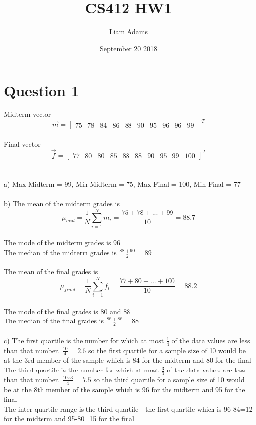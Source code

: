 \documentclass{article}
\title{CS412 HW1}
\author{Liam Adams }
\date{September 20 2018}
\begin{document}
\maketitle

\section{Question 1}
Midterm vector $$\vec{m} = \begin{bmatrix} 75 & 78 & 84 & 86 & 88 & 90 & 95 & 96 & 96 & 99 \end{bmatrix}^T$$\\
Final vector $$\vec{f} = \begin{bmatrix} 77 & 80 & 80 & 85 & 88 & 88 & 90 & 95 & 99 & 100 \end{bmatrix}^T$$\\\\
a) Max Midterm = 99, Min Midterm = 75, Max Final = 100, Min Final = 77\\\\
b) The mean of the midterm grades is $$\mu_{mid}=\frac{1}{N}\sum\limits_{i=1}^{N} m_i=\frac{75+78+...+99}{10}=88.7$$\\
   The mode of the midterm grades is 96\\
   The median of the midterm grades is $\frac{88+90}{2}=89$\\\\
   The mean of the final grades is $$\mu_{final}=\frac{1}{N}\sum\limits_{i=1}^{N}f_i=\frac{77+80+...+100}{10}=88.2$$\\
   The mode of the final grades is 80 and 88\\
   The median of the final grades is $\frac{88+88}{2}=88$\\\\
c) The first quartile is the number for which at most $\frac{1}{4}$ of the data values are less than that number.  $\frac{10}{4}=2.5$ so the first quartile for a sample size of 10 would be at the 3rd member of the sample which is 84 for the midterm and 80 for the final\\
The third quartile is the number for which at most $\frac{3}{4}$ of the data values are less than that number.  $\frac{10x3}{4}=7.5$ so the third quartile for a sample size of 10 would be at the 8th member of the sample which is 96 for the midterm and 95 for the final\\
The inter-quartile range is the third quartile - the first quartile which is 96-84=12 for the midterm and 95-80=15 for the final\\\\
\end{document}
